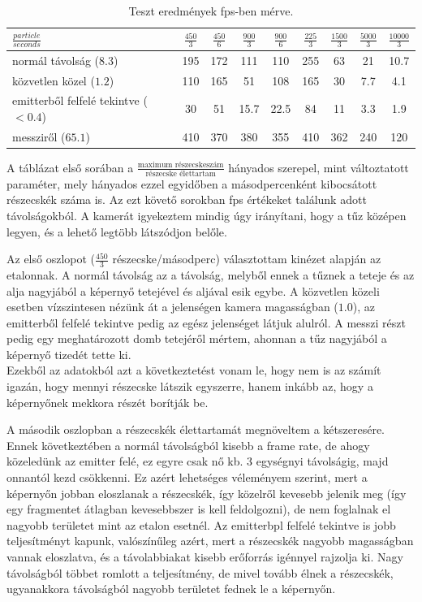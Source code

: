 \begin{table}[h!]
\centering
\begin{tabular}{ m{10em}|c|c|c|c|c|c|c|c| } 
 $\frac{particle}{seconds}$ & $\frac{450}{3}$ & $\frac{450}{6}$ & $\frac{900}{3}$ & $\frac{900}{6}$ & $\frac{225}{3}$ & $\frac{1500}{3}$ & $\frac{5000}{3}$ & $\frac{10000}{3}$ \\  \hline
 
 normál távolság ($8.3$) & 195 & 172 & 111 & 110 & 255 & 63 & 21 & 10.7\\  \hline
 közvetlen közel ($1.2$) & 110 & 165 & 51 & 108 & 165 & 30 & 7.7 & 4.1\\  \hline
 emitterből felfelé tekintve ($<0.4$) & 30 &  51 & 15.7 & 22.5 & 84 & 11 & 3.3 & 1.9\\ \hline
 messziről ($65.1$) & 410 &  370 & 380 & 355 & 410 & 362 & 240 & 120\\ 
 \hline
\end{tabular}
\caption{Teszt eredmények fps-ben mérve.}
\label{table:1}
\end{table}

A táblázat első sorában a $\frac{\text{maximum részecskeszám}}{\text{részecske élettartam}}$ hányados szerepel, mint változtatott paraméter, mely hányados ezzel egyidőben a másodpercenként kibocsátott részecskék száma is. Az ezt követő sorokban fps értékeket találunk adott távolságokból. A kamerát igyekeztem mindig úgy irányítani, hogy a tűz középen legyen, és a lehető legtöbb látszódjon belőle.

Az első oszlopot ($\frac{450}{3}$ részecske/másodperc) választottam kinézet alapján az etalonnak. A normál távolság az a távolság, melyből ennek a tűznek a teteje és az alja nagyjából a képernyő tetejével és aljával esik egybe. A közvetlen közeli esetben vízszintesen nézünk át a jelenségen kamera magasságban ($1.0$), az emitterből felfelé tekintve pedig az egész jelenséget látjuk alulról. A messzi részt pedig egy meghatározott domb tetejéről mértem, ahonnan a tűz nagyjából a képernyő tizedét tette ki.\\
Ezekből az adatokból azt a következtetést vonam le, hogy nem is az számít igazán, hogy mennyi részecske látszik egyszerre, hanem inkább az, hogy a képernyőnek mekkora részét borítják be.

A második oszlopban a részecskék élettartamát megnöveltem a kétszeresére. Ennek következtében a normál távolságból kisebb a frame rate, de ahogy közeledünk az emitter felé, ez egyre csak nő kb. 3 egységnyi távolságig, majd onnantól kezd csökkenni. Ez azért lehetséges véleményem szerint, mert a képernyőn jobban eloszlanak a részecskék, így közelről kevesebb jelenik meg (így egy fragmentet átlagban kevesebbszer is kell feldolgozni), de nem foglalnak el nagyobb területet mint az etalon esetnél. Az emitterbpl felfelé tekintve is jobb teljesítményt kapunk, valószínűleg azért, mert a részecskék nagyobb magasságban vannak eloszlatva, és a távolabbiakat kisebb erőforrás igénnyel rajzolja ki. Nagy távolságból többet romlott a teljesítmény, de mivel tovább élnek a részecskék, ugyanakkora távolságból nagyobb területet fednek le a képernyőn.

